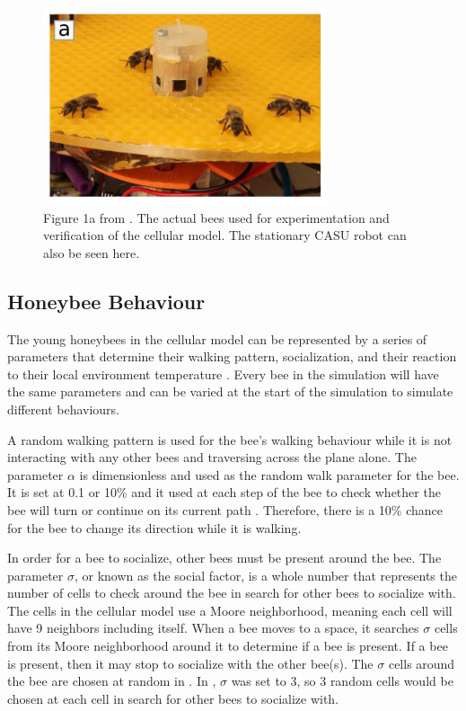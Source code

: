 \documentclass[conference,compsoc,onecolumn]{IEEEtran}
\begin{document}
\begin{figure}[htbp]
	\centerline{\includegraphics[scale=0.85]{../images/fig1a-stefanec2017.png}}
	\caption{Figure 1a from \cite{Stefanc2017}. The actual bees used for experimentation and verification of the cellular model. The stationary CASU robot can also be seen here.}
	\label{figx1}
\end{figure}

\subsection{Honeybee Behaviour}
The young honeybees in the cellular model can be represented by a series of parameters that determine their walking pattern, socialization, and their reaction to their local environment temperature \cite{Stefanc2017}. Every bee in the simulation will have the same parameters and can be varied at the start of the simulation to simulate different behaviours.

A random walking pattern is used for the bee's walking behaviour while it is not interacting with any other bees and traversing across the plane alone. The parameter $\alpha$ is dimensionless and used as the random walk parameter for the bee. It is set at 0.1 or 10\% and it used at each step of the bee to check whether the bee will turn or continue on its current path \cite{Stefanc2017}. Therefore, there is a 10\% chance for the bee to change its direction while it is walking.

In order for a bee to socialize, other bees must be present around the bee. The parameter $\sigma$, or known as the social factor, is a whole number that represents the number of cells to check around the bee in search for other bees to socialize with. The cells in the cellular model use a Moore neighborhood, meaning each cell will have 9 neighbors including itself. When a bee moves to a space, it searches $\sigma$ cells from its Moore neighborhood around it to determine if a bee is present. If a bee is present, then it may stop to socialize with the other bee(s). The $\sigma$ cells around the bee are chosen at random in \cite{Stefanc2017}. In \cite{Stefanc2017}, $\sigma$ was set to 3, so 3 random cells would be chosen at each cell in search for other bees to socialize with.
\end{document}
